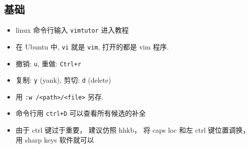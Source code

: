 
\begin{issues}
\issueDraft
\end{issues}

\subsection{基础}
\begin{itemize}
\item linux 命令行输入 \verb`vimtutor` 进入教程
\item 在 Ubuntu 中, \verb`vi` 就是 \verb`vim`, 打开的都是 vim 程序.
\item 撤销: \verb`u`, 重做: \verb`Ctrl+r`
\item 复制: \verb`y` (yank), 剪切: \verb`d` (delete)
\item 用 \verb`:w /<path>/<file>` 另存.
\item 命令行用 \verb`ctrl+D` 可以查看所有候选的补全
\item 由于 ctrl 键过于重要， 建议仿照 hhkb， 将 caps loc 和左 ctrl 键位置调换， 用 sharp keys 软件就可以 
\end{itemize}

